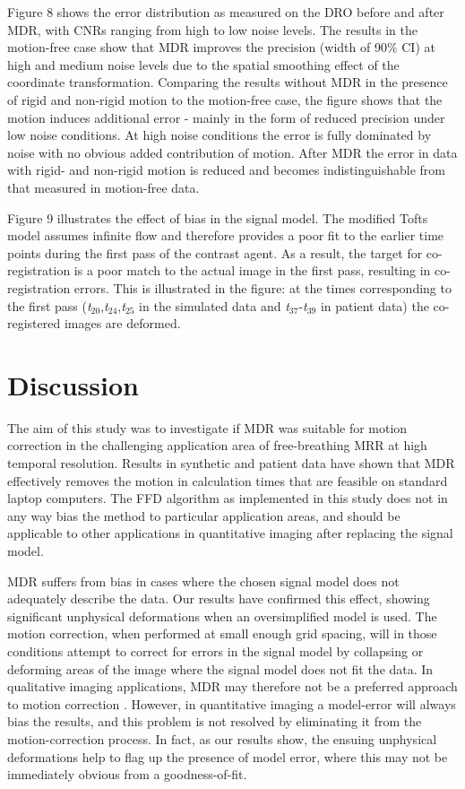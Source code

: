 \documentclass[num-refs]{wiley-article}
\begin{document}
Figure 8 shows the error distribution as measured on the DRO before and after MDR, with CNRs ranging from high to low noise levels. The results in the motion-free case show that MDR improves the precision (width of 90\% CI) at high and medium noise levels due to the spatial smoothing effect of the coordinate transformation. Comparing the results without MDR in the presence of rigid and non-rigid motion to the motion-free case, the figure shows that the motion induces additional error - mainly in the form of reduced precision under low noise conditions. At high noise conditions the error is fully dominated by noise with no obvious added contribution of motion. After MDR the error in data with rigid- and non-rigid motion is reduced and becomes indistinguishable from that measured in motion-free data.

Figure 9 illustrates the effect of bias in the signal model. The modified Tofts model assumes infinite flow and therefore provides a poor fit to the earlier time points during the first pass of the contrast agent. As a result, the target for co-registration is a poor match to the actual image in the first pass, resulting in co-registration errors. This is illustrated in the figure: at the times corresponding to the first pass ({\it t}$_{20}$,{\it t}$_{24}$,{\it t}$_{25}$ in the simulated data and {\it t}$_{37}$-{\it t}$_{39}$ in patient data) the co-registered images are deformed. 

\section{Discussion}

The aim of this study was to investigate if MDR was suitable for motion correction in the challenging application area of free-breathing MRR at high temporal resolution. Results in synthetic and patient data have shown that MDR effectively removes the motion in calculation times that are feasible on standard laptop computers. The FFD algorithm as implemented in this study does not in any way bias the method to particular application areas, and should be applicable to other applications in quantitative imaging after replacing the signal model. 

MDR suffers from bias in cases where the chosen signal model does not adequately describe the data. Our results have confirmed this effect, showing significant unphysical deformations when an oversimplified model is used. The motion correction, when performed at small enough grid spacing, will in those conditions attempt to correct for errors in the signal model by collapsing or deforming areas of the image where the signal model does not fit the data. In qualitative imaging applications, MDR may therefore not be a preferred approach to motion correction \cite{Schnabel2016}. However, in quantitative imaging a model-error will always bias the results, and this problem is not resolved by eliminating it from the motion-correction process. In fact, as our results show, the ensuing unphysical deformations help to flag up the presence of model error, where this may not be immediately obvious from a goodness-of-fit. 
\end{document}
